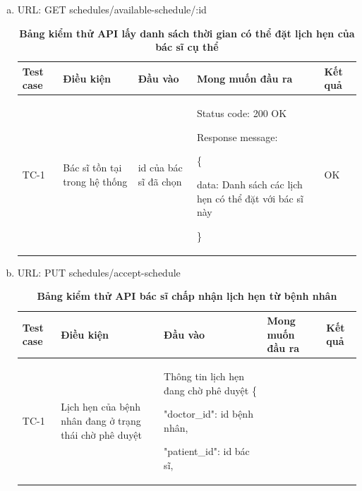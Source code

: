 \begin{enumerate}[a)]
  \item URL: GET schedules/available-schedule/:id
    \begin{xltabular}{\textwidth}{
    | >{\raggedright\arraybackslash}p{1cm}
    | >{\raggedright\arraybackslash}p{2.5cm}
    | >{\raggedright\arraybackslash}X
    | >{\raggedright\arraybackslash}X
    | >{\raggedright\arraybackslash}p{1cm}|
    }
    \caption{\bfseries \fontsize{12pt}{0pt}\selectfont Bảng kiểm thử API lấy danh sách thời gian có thể đặt lịch hẹn của bác sĩ cụ thể}
    \\
    \hline
    \bfseries Test case    &\bfseries Điều kiện   &\bfseries Đầu vào 
    &\bfseries Mong muốn đầu ra &\bfseries Kết quả\\ \hline
  
  
    TC-1
    & Bác sĩ tồn tại trong hệ thống
    & id của bác sĩ đã chọn
    & 
  
    Status code: 200 OK
  
      Response message:
  
      \{

    data: Danh sách các lịch hẹn có thể đặt với bác sĩ này
  
    \}
    
    & OK
  
    \\ \hline
  
    \end{xltabular}

  \item URL: PUT schedules/accept-schedule
    \begin{xltabular}{\textwidth}{
    | >{\raggedright\arraybackslash}p{1cm}
    | >{\raggedright\arraybackslash}p{2.5cm}
    | >{\raggedright\arraybackslash}X
    | >{\raggedright\arraybackslash}X
    | >{\raggedright\arraybackslash}p{1cm}|
    }
    \caption{\bfseries \fontsize{12pt}{0pt}\selectfont Bảng kiểm thử API bác sĩ chấp nhận lịch hẹn từ bệnh nhân}
    \\
    \hline
    \bfseries Test case    &\bfseries Điều kiện   &\bfseries Đầu vào 
    &\bfseries Mong muốn đầu ra &\bfseries Kết quả\\ \hline
  
  
    TC-1
    & Lịch hẹn của bệnh nhân đang ở trạng thái chờ phê duyệt
    & Thông tin lịch hẹn đang chờ phê duyệt
    \{

    "doctor\_id": id bệnh nhân,

    "patient\_id": id bác sĩ,


\end{xltabular}
\end{enumerate}
